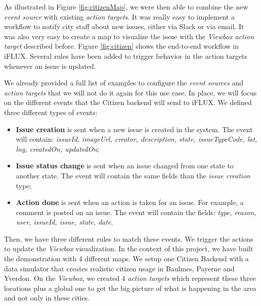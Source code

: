 As illustrated in Figure \ref{fig:citizenMap}, we were then able to combine the new \emph{event source} with existing \emph{action targets}. It was really easy to implement a workflow to notify city staff about new issues, either via Slack or via email. It was also very easy to create a map to visualize the issue with the \emph{Viewbox action target} described before. Figure \ref{fig:citizen} shows the end-to-end workflow in iFLUX. Several rules have been added to trigger behavior in the action targets whenever an issue is updated.

We already provided a full list of examples to configure the \emph{event sources} and \emph{action targets} that we will not do it again for this use case. In place, we will focus on the different events that the Citizen backend will send to iFLUX. We defined three different types of events:

\begin{itemize}
\item\textbf{Issue creation} is sent when a new issue is created in the system. The event will contain: \emph{issueId, imageUrl, creator, description, state, issueTypeCode, lat, lng, createdOn, updatedOn};
\item\textbf{Issue status change} is sent when an issue changed from one state to another state. The event will contain the same fields than the \emph{issue creation} type;
\item\textbf{Action done} is sent when an action is taken for an issue. For example, a comment is posted on an issue. The event will contain the fields: \emph{type, reason, user, issueId, issue, state, date}.
\end{itemize}

Then, we have three different rules to match these events. We trigger the actions to update the \emph{Viewbox} visualization. In the context of this project, we have built the demonstration with 4 different maps. We setup one Citizen Backend with a data simulator that creates realistic citizen usage in Baulmes, Payerne and Yverdon. On the \emph{Viewbox}, we created 4 \emph{action targets} which represent these three locations plus a global one to get the big picture of what is happening in the area and not only in these cities.



